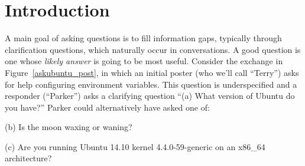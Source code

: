 \documentclass[11pt]{report}
\begin{document}
\section{Introduction}\label{introduction}

A main goal of asking questions is to fill information gaps, typically through clarification questions, which naturally occur in conversations. 
A good question is one whose \emph{likely answer} is going to be most useful.
Consider the exchange in Figure~\ref{askubuntu_post}, in which an initial poster (who we'll call ``Terry'') asks for help configuring environment variables.
This question is underspecified and a responder (``Parker'') asks a clarifying question ``\textsf{\small (a) What version of Ubuntu do you have?}''
Parker could alternatively have asked one of:

\textsf{\small(b) Is the moon waxing or waning?}

\textsf{\small(c) Are you running Ubuntu 14.10 kernel 4.4.0-59-generic on an x86\_64 architecture?}
\end{document}
